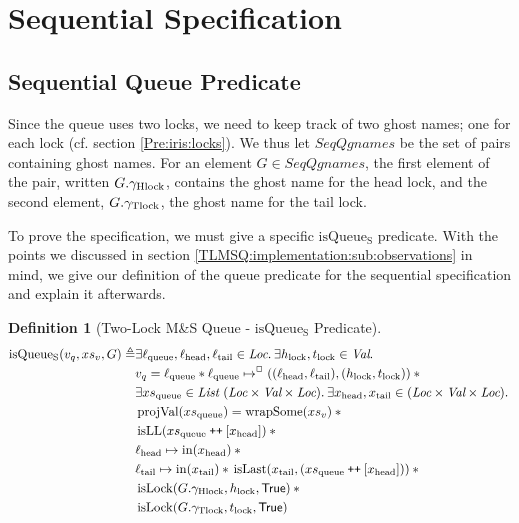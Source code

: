 \documentclass[a4paper, 10pt]{report}
\theoremstyle{definition}
\newtheorem{definition}{Definition}[section]
\newcommand{\isLock}{\operatorname{isLock}}
\newcommand{\msq}{M\&S Queue}
\newcommand{\tlmsq}{Two-Lock \msq{}}
\newcommand{\isqueueseq}{\operatorname{isQueue_{S}}}
\newcommand{\SeqQgnames}{SeqQgnames}
\newcommand{\vq}{v_q}
\newcommand{\xsqueue}{xs_{\mathrm{queue}}}
\newcommand{\isLL}{\operatorname{isLL}}
\newcommand{\projval}{\operatorname{projVal}}
\newcommand{\wrapsome}{\operatorname{wrapSome}}
\newcommand{\isLast}{\operatorname{isLast}}
\newcommand{\locN}[1]{\loc_{\mathrm{#1}}}
\newcommand{\lochead}{\locN{head}}
\newcommand{\loctail}{\locN{tail}}
\newcommand{\locqueue}{\locN{queue}}
\newcommand{\nIn}[1]{\operatorname{in}(#1)}
\newcommand{\node}{x}
\newcommand{\nodeN}[1]{\node_{\mathrm{#1}}}
\newcommand{\nodehead}{\nodeN{head}}
\newcommand{\nodetail}{\nodeN{tail}}
\newcommand{\absvalueList}{xs_v}
\newcommand{\Hlock}{h_{\mathrm{lock}}}
\newcommand{\Tlock}{t_{\mathrm{lock}}}
\newcommand{\Qg}{G}
\newcommand{\ghlock}{\gname_{\mathrm{Hlock}}}
\newcommand{\gtlock}{\gname_{\mathrm{Tlock}}}
\newcommand\catenate{\mathbin{\text{\ttfamily\upshape ++}}}
\begin{document}
\section{Sequential Specification}
\label{TLMSQSPECS:section:sequential}

\subsection{Sequential Queue Predicate}
\label{TLMSQSPECS:sequential:sub:seq-queue-pred}

Since the queue uses two locks, we need to keep track of two ghost names; one for each lock (cf. section \ref{Pre:iris:locks}). We thus let $\SeqQgnames$ be the set of pairs containing ghost names. For an element $\Qg \in \SeqQgnames$, the first element of the pair, written $\Qg.\ghlock$, contains the ghost name for the head lock, and the second element, $\Qg.\gtlock$, the ghost name for the tail lock.

To prove the specification, we must give a specific $\isqueueseq$ predicate. With the points we discussed in section \ref{TLMSQ:implementation:sub:observations} in mind, we give our definition of the queue predicate for the sequential specification and explain it afterwards.
\begin{definition}[\tlmsq{} - $\isqueueseq$ Predicate]\label{TLMSQ:spec:seq:isqueueseq}
\begin{align*}
  \isqueueseq(\vq, \absvalueList, \Qg) \eqdef
  &\Exists \locqueue, \lochead, \loctail \in \Loc . \Exists \Hlock, \Tlock \in \Val . \\
  &\vq = \locqueue \star{} \locqueue \mapsto^{\persistently} ((\lochead, \loctail), (\Hlock, \Tlock)) \star{}\\
  &\Exists \xsqueue \in \List ~ (\Loc \times \Val \times \Loc) . \Exists \nodehead, \nodetail \in (\Loc \times \Val \times \Loc) .\\
	&\projval(\xsqueue) = \wrapsome(\absvalueList) \star{}\\
	&\isLL (\xsqueue \catenate [\nodehead]) \star{}\\
	&\lochead \mapsto \nIn{\nodehead} \star{}\\
	&\loctail \mapsto \nIn{\nodetail} \star{} \isLast(\nodetail, (\xsqueue \catenate [\nodehead])) \star{}\\
	&\isLock(\Qg.\ghlock, \Hlock, \TRUE) \star{}\\
	&\isLock(\Qg.\gtlock, \Tlock, \TRUE)
\end{align*}
\end{definition}
\end{document}

